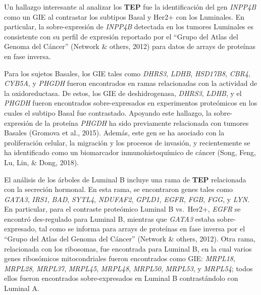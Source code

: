 \documentclass[12pt,twoside]{reedthesis}
\begin{document}
\par

Un hallazgo interesante al analizar los \textbf{TEP} fue la identificación del gen \emph{INPP4B} como un GIE al contrastar los subtipos Basal y Her2+ con los Luminales. En particular, la sobre-expresión de \emph{INPP4B} detectada en los tumores Luminales es consistente con su perfil de expresión reportado por el ``Grupo del Atlas del Genoma del Cáncer'' (Network \& others, 2012) para datos de arrays de proteínas en fase inversa.

\par

Para los sujetos Basales, los GIE tales como \emph{DHRS3}, \emph{LDHB}, \emph{HSD17B8}, \emph{CBR4}, \emph{CYB5A}, y \emph{PHGDH} fueron encontrados en ramas relacionadas con la actividad de la oxidoreductasa. De estos, los GIE de deshidrogenasa, \emph{DHRS3}, \emph{LDHB}, y el \emph{PHGDH} fueron encontrados sobre-expresados en experimentos proteómicos en los cuales el subtipo Basal fue contrastado. Apoyando este hallazgo, la sobre-expresión de la proteína \emph{PHGDH} ha sido previamente relacionada con tumores Basales (Gromova et al., 2015). Además, este gen se ha asociado con la proliferación celular, la migración y los procesos de invasión, y recientemente se ha identificado como un biomarcador inmunohistoquímico de cáncer (Song, Feng, Lu, Lin, \& Dong, 2018).

\par

El análisis de los árboles de Luminal B incluye una rama de \textbf{TEP} relacionada con la secreción hormonal. En esta rama, se encontraron genes tales como \emph{GATA3}, \emph{IRS1}, \emph{BAD}, \emph{SYTL4}, \emph{NDUFAF2}, \emph{GPLD1}, \emph{EGFR}, \emph{FGB}, \emph{FGG}, y \emph{LYN}. En particular, para el contraste proteómico Luminal B vs.~Her2+, \emph{EGFR} se encontró des-regulado para Luminal B, mientras que \emph{GATA3} estaba sobre-expresado, tal como se informa para arrays de proteínas en fase inversa por el ``Grupo del Atlas del Genoma del Cáncer'' (Network \& others, 2012). Otra rama, relacionada con los ribosomas, fue encontrada para Luminal B, en la cual varios genes ribosómicos mitocondriales fueron encontrados como GIE: \emph{MRPL18}, \emph{MRPL28}, \emph{MRPL37}, \emph{MRPL45}, \emph{MRPL48}, \emph{MRPL50}, \emph{MRPL53}, y \emph{MRPL54}; todos ellos fueron encontrados sobre-expresados en Luminal B contrastándolo con Luminal A.

\par
\end{document}
